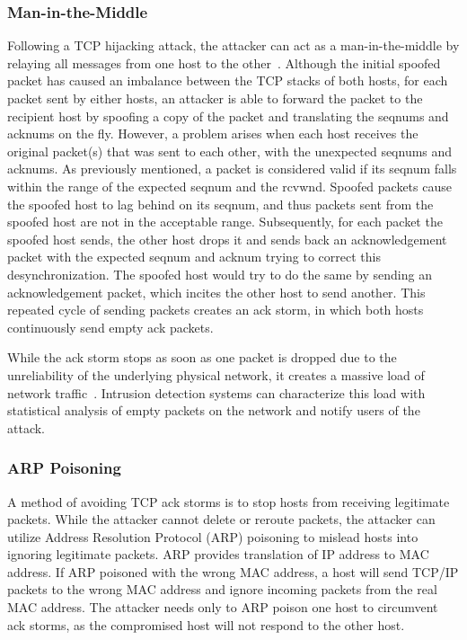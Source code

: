 \documentclass{sig-alternate}
\begin{document}
\subsubsection{Man-in-the-Middle}

Following a TCP hijacking attack, the attacker can act as a man-in-the-middle by relaying all messages from one host to the other~\cite{joncheray:simpleattack, gregg:stackhack}.
Although the initial spoofed packet has caused an imbalance between the TCP stacks of both hosts, for each packet sent by either hosts, an attacker is able to forward the packet to the recipient host by spoofing a copy of the packet and translating the seqnums and acknums on the fly.
However, a problem arises when each host receives the original packet(s) that was sent to each other, with the unexpected seqnums and acknums.
As previously mentioned, a packet is considered valid if its seqnum falls within the range of the expected seqnum and the rcvwnd.
Spoofed packets cause the spoofed host to lag behind on its seqnum, and thus packets sent from the spoofed host are not in the acceptable range.
Subsequently, for each packet the spoofed host sends, the other host drops it and sends back an acknowledgement packet with the expected seqnum and acknum trying to correct this desynchronization.
The spoofed host would try to do the same by sending an acknowledgement packet, which incites the other host to send another.
This repeated cycle of sending packets creates an ack storm, in which both hosts continuously send empty ack packets.

While the ack storm stops as soon as one packet is dropped due to the unreliability of the underlying physical network, it creates a massive load of network traffic~\cite{joncheray:simpleattack}.
Intrusion detection systems can characterize this load with statistical analysis of empty packets on the network and notify users of the attack.

\subsubsection{ARP Poisoning}

A method of avoiding TCP ack storms is to stop hosts from receiving legitimate packets.
While the attacker cannot delete or reroute packets, the attacker can utilize Address Resolution Protocol (ARP) poisoning to mislead hosts into ignoring legitimate packets.
ARP provides translation of IP address to MAC address.
If ARP poisoned with the wrong MAC address, a host will send TCP/IP packets to the wrong MAC address and ignore incoming packets from the real MAC address.
The attacker needs only to ARP poison one host to circumvent ack storms, as the compromised host will not respond to the other host.
\end{document}
